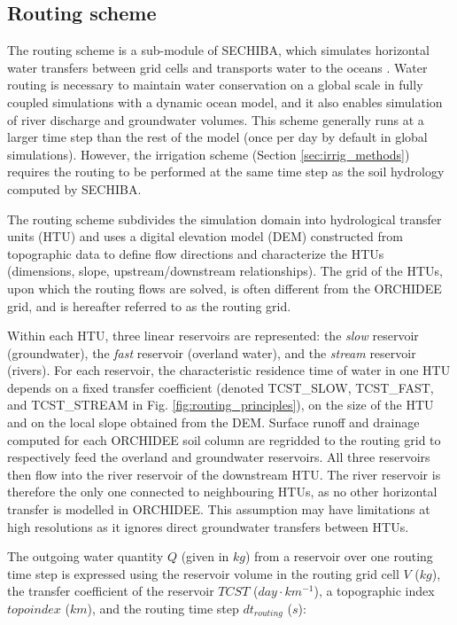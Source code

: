 \subsection{Routing scheme}
\label{section:routing_methods}
The routing scheme is a sub-module of SECHIBA, which simulates horizontal water transfers between grid cells and transports water to the oceans \citep{ducharne_development_2003, ngo-duc_validation_2007}. 
Water routing is necessary to maintain water conservation on a global scale in fully coupled simulations with a dynamic ocean model, and it also enables simulation of river discharge and groundwater volumes. 
This scheme generally runs at a larger time step than the rest of the model (once per day by default in global simulations). However, the irrigation scheme (Section \ref{sec:irrig_methods}) requires the routing to be performed at the same time step as the soil hydrology computed by SECHIBA. 

The routing scheme subdivides the simulation domain into hydrological transfer units (HTU) and uses a digital elevation model (DEM) constructed from topographic data to define flow directions and characterize the HTUs (dimensions, slope, upstream/downstream relationships). The grid of the HTUs, upon which the routing flows are solved, is often different from the ORCHIDEE grid, and is hereafter referred to as the routing grid.

Within each HTU, three linear reservoirs are represented: the \textit{slow} reservoir (groundwater), the \textit{fast} reservoir (overland water), and the \textit{stream} reservoir (rivers). For each reservoir, the characteristic residence time of water in one HTU depends on a fixed transfer coefficient (denoted TCST\_SLOW, TCST\_FAST, and TCST\_STREAM in Fig. \ref{fig:routing_principles}), on the size of the HTU and on the local slope obtained from the DEM.
Surface runoff and drainage computed for each ORCHIDEE soil column are regridded to the routing grid to respectively feed the overland and groundwater reservoirs. All three reservoirs then flow into the river reservoir of the downstream HTU. The river reservoir is therefore the only one connected to neighbouring HTUs, as no other horizontal transfer is modelled in ORCHIDEE. This assumption may have limitations at high resolutions as it ignores direct groundwater transfers between HTUs.

The outgoing water quantity $Q$ (given in $kg$) from a reservoir over one routing time step is expressed using the reservoir volume in the routing grid cell $V$ ($kg$), the transfer coefficient of the reservoir $TCST$ ($day \cdot km^{-1}$), a topographic index $topoindex$ ($km$), and the routing time step $dt_{routing}$ ($s$):

